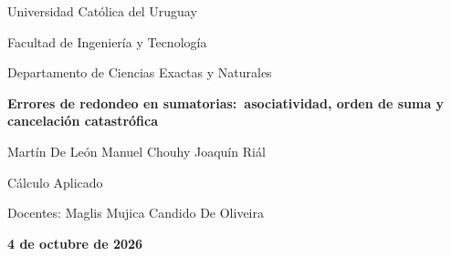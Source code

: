 \documentclass[11pt,a4paper]{article}
\begin{document}
\begin{titlepage}
  \centering
  \vspace*{2cm}
  {\Large Universidad Católica del Uruguay\par}
  {\large Facultad de Ingeniería y Tecnología\par}
  {\large Departamento de Ciencias Exactas y Naturales\par}
  \vspace{2.5cm}
  {\LARGE\bfseries Errores de redondeo en sumatorias:\ asociatividad, orden de suma y cancelación catastrófica\par}
  \vspace{2cm}
  {\large Martín De León \quad Manuel Chouhy \quad Joaquín Riál\par}
  \vspace{2cm}
  {\large Cálculo Aplicado\par}
  {\large Docentes: Maglis Mujica \quad Candido De Oliveira\par}
  \vspace{1.5cm}
  {\large \textbf{4 de octubre de 2026}\par}
  \vfill
\end{titlepage}


\clearpage

\tableofcontents
\clearpage








\end{document}
